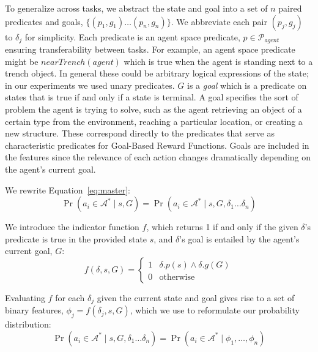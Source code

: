 \documentclass[11pt]{article}
\begin{document}
To generalize across tasks, we abstract the state
and goal into a set of $n$ paired predicates and goals, $\{
(p_1, g_1) \ldots (p_{n}, g_{n}) \}$. We abbreviate each pair $(p_j,
g_j)$ to $\delta_j$ for simplicity. Each predicate is an agent space predicate, $p \in
\mathcal{P}_{agent}$ ensuring transferability between tasks. For example, an agent space
predicate might be $nearTrench(agent)$ which is true when the agent is
standing next to a trench object.  In general these could be arbitrary
logical expressions of the state; in our experiments we used unary
predicates. $G$ is a {\it goal} which is a predicate on states that is true if and only if a state is terminal.
A goal specifies the sort of problem the agent is trying to solve, such as the agent
retrieving an object of a certain type from the environment, reaching
a particular location, or creating a new structure. These correspond directly to the predicates that serve
as characteristic predicates for Goal-Based Reward Functions. Goals are included in the features since the relevance of each action changes
dramatically depending on the agent's current goal.

We rewrite Equation~\ref{eq:master}:
\begin{equation}
\Pr(a_i \in \mathcal{A}^* \mid s, G) = \Pr(a_i \in \mathcal{A}^* \mid s, G, \delta_1 \ldots \delta_n)
\end{equation}

We introduce the indicator function $f$, which returns 1 if and only if the given $\delta$'s predicate is true in the provided state $s$, and $\delta$'s goal is entailed by the agent's current goal, $G$:
\begin{equation}
f(\delta, s, G) = 
\begin{cases}
1& \delta.p(s) \wedge \delta.g(G) \\
0& \text{otherwise}
\end{cases}
\label{eq:f_func_def}
\end{equation}

Evaluating $f$ for each $\delta_j$ given the current state and goal gives rise to a set of binary features,
$\phi_j = f(\delta_j, s, G)$, which we use to reformulate our probability distribution:
\begin{equation}
\Pr(a_i \in \mathcal{A}^*  \mid s, G, \delta_1 \ldots \delta_n) = \Pr(a_i \in \mathcal{A}^*  \mid \phi_1, \ldots, \phi_n)
\label{eq:master_eq}
\end{equation}
\end{document}
